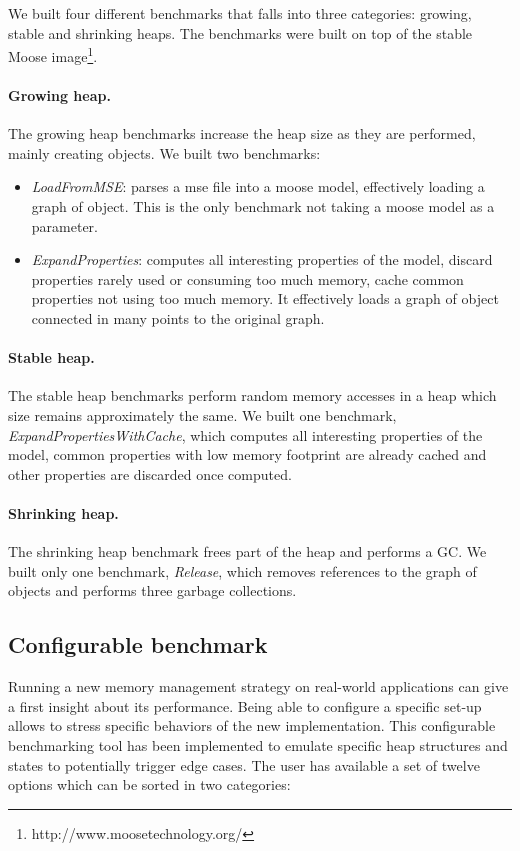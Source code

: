 \documentclass[10pt, sigplan]{acmart}
\begin{document}
We built four different benchmarks that falls into three categories: growing, stable and shrinking heaps. The benchmarks were built on top of the stable Moose image\footnote{http://www.moosetechnology.org/}.

\paragraph{Growing heap.} The growing heap benchmarks increase the heap size as they are performed, mainly creating objects. We built two benchmarks:
\begin{itemize}
	\item \emph{LoadFromMSE}: parses a mse file into a moose model, effectively loading a graph of object. This is the only benchmark not taking a moose model as a parameter.
	\item \emph{ExpandProperties}: computes all interesting properties of the model, discard properties rarely used or consuming too much memory, cache common properties not using too much memory. It effectively loads a graph of object connected in many points to the original graph. 
\end{itemize}

\paragraph{Stable heap.} The stable heap benchmarks perform random memory accesses in a heap which size remains approximately the same. We built one benchmark, \emph{ExpandPropertiesWithCache}, which computes all interesting properties of the model, common properties with low memory footprint are already cached and other properties are discarded once computed.

\paragraph{Shrinking heap.} The shrinking heap benchmark frees part of the heap and performs a GC. We built only one benchmark, \emph{Release}, which removes references to the graph of objects and performs three garbage collections.

\subsection{Configurable benchmark}
\label{sec:confBench}

Running a new memory management strategy on real-world applications can give a first insight about its performance. Being able to configure a specific set-up allows to stress specific behaviors of the new implementation.
This configurable benchmarking tool has been implemented to emulate specific heap structures and states to potentially trigger edge cases. The user has available a set of twelve options which can be sorted in two categories:
\end{document}
